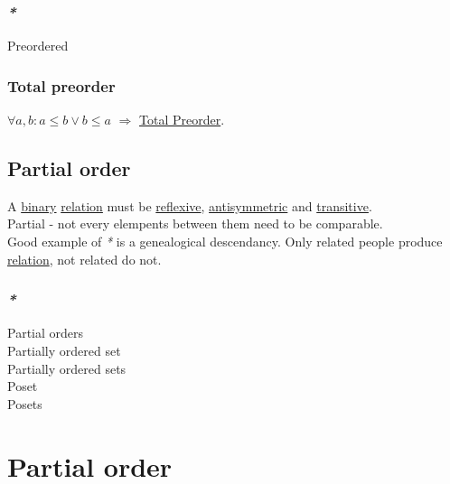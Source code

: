 \documentclass[a4paper,14pt,oneside]{book}
\begin{document}
{\subsubsection{\emph{*}}
\label{sec:orgce2b4b0}

\label{orgcdd537e}Preordered\\

\subsubsection{\label{orgac21fd1}Total preorder}
\label{sec:org5aa149a}

\(\forall a,b : a \le b \lor b \le a\) \(\Rightarrow\) \hyperref[orgac21fd1]{Total Preorder}.\\

\subsection{\label{org54f1bb6}Partial order}
\label{sec:orgff10fc5}

A \hyperref[orge428263]{binary} \hyperref[orgc61e9ed]{relation} must be \hyperref[orgabc6f82]{reflexive}, \hyperref[org632830b]{antisymmetric} and \hyperref[orgf56af6a]{transitive}.\\

Partial - not every elempents between them need to be comparable.\\

Good example of \emph{*} is a genealogical descendancy. Only related people produce \hyperref[orgc61e9ed]{relation}, not related do not.\\

\subsubsection{\emph{*}}
\label{sec:org054f757}

\label{org2d8ea70}Partial orders\\
\label{orge61ce13}Partially ordered set\\
\label{org743f3c6}Partially ordered sets\\
\label{org7c18e55}Poset\\
\label{orgcd70a78}Posets\\

\section{\label{org3884bdc}Partial order}
\label{sec:orgcb6cfb7}

}
\end{document}
